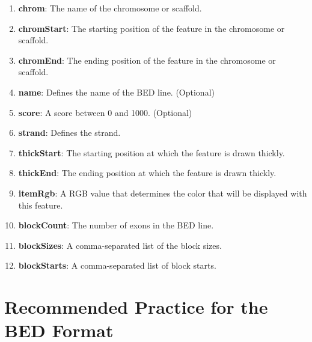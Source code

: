 \documentclass[12pt]{article}
\begin{document}
\begin{enumerate}
  \item \textbf{chrom}: The name of the chromosome or scaffold.
  \item \textbf{chromStart}: The starting position of the feature in the 
    chromosome or scaffold.
  \item \textbf{chromEnd}: The ending position of the feature in the chromosome
    or scaffold.
  \item \textbf{name}: Defines the name of the BED line. (Optional)
  \item \textbf{score}: A score between 0 and 1000. (Optional)
  \item \textbf{strand}: Defines the strand.
  \item \textbf{thickStart}: The starting position at which the feature
    is drawn thickly.
  \item \textbf{thickEnd}: The ending position at which the feature is drawn
    thickly.
  \item \textbf{itemRgb}: A RGB value that determines the color that will
    be displayed with this feature.
  \item \textbf{blockCount}: The number of exons in the BED line.
  \item \textbf{blockSizes}: A comma-separated list of the block sizes.
  \item \textbf{blockStarts}: A comma-separated list of block starts.
\end{enumerate}
\section{Recommended Practice for the BED Format}
\end{document}
